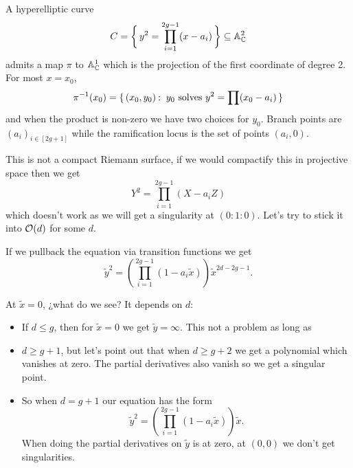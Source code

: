 \documentclass[12pt]{memoir}
\begin{document}
A hyperelliptic curve 
$$C=\biggl\{\,y^2=\prod_{i=1}^{2g-1}(x-a_i)\,\biggr\}\subseteq\mathbb{A}^2_{\mathbb{C}}$$
admits a map $\pi$ to $\mathbb{A}^1_{\mathbb{C}}$ which is the projection of the first coordinate of degree 2. For most $x=x_0$, 
$$\pi^{-1}(x_0)=\{\,(x_0,y_0)\mathbin{:}\ y_0\text{ solves }y^2=\prod(x_0-a_i)\,\}$$
and when the product is non-zero we have two choices for $y_0$. Branch points are $(a_i)_{i\in[2g+1]}$ while the ramification locus is the set of points $(a_i,0)$.\par
This is not a compact Riemann surface, if we would compactify this in projective space then we get 
$$Y^2=\prod_{i=1}^{2g-1}(X-a_iZ)$$
which doesn't work as we will get a singularity at $(0:1:0)$. Let's try to stick it into $\mathcal{O}(d)$ for some $d$.

\begin{center}

\end{center}


If we pullback the equation via transition functions we get 
$$\tilde{y}^2=\left(\prod_{i=1}^{2g-1}(1-a_i\tilde{x})\right)\tilde{x}^{2d-2g-1}.$$

At $\tilde{x}=0$, ¿what do we see? It depends on $d$:
\begin{itemize}
    \item If $d\leq g$, then for $\tilde{x}=0$ we get $\tilde{y}=\infty$. This not a problem as long as
    \item $d\geq g+1$, but let's point out that when $d\geq g+2$ we get a polynomial which vanishes at zero. The partial derivatives also vanish so we get a singular point.
    \item So when $d=g+1$ our equation has the form 
    $$\tilde{y}^2=\left(\prod_{i=1}^{2g-1}(1-a_i\tilde{x})\right)\tilde{x}.$$
    When doing the partial derivatives on $\tilde{y}$ is at zero, at $(0,0)$ we don't get singularities.
\end{itemize}
\end{document}
